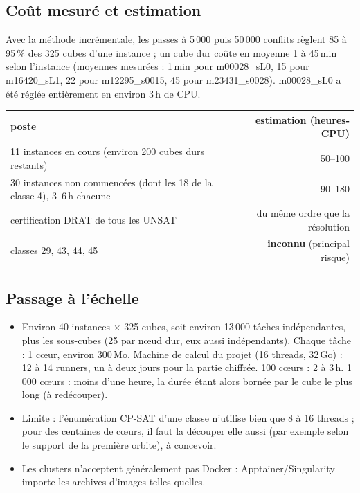\subsection{Coût mesuré et estimation}
Avec la méthode incrémentale, les passes à 5\,000 puis 50\,000 conflits règlent 85 à 95\,\% des 325 cubes d'une instance ; un cube dur coûte
en moyenne 1 à 45\,min selon l'instance (moyennes mesurées : 1\,min pour m00028\_sL0, 15 pour m16420\_sL1, 22 pour m12295\_s0015, 45 pour
m23431\_s0028). m00028\_sL0 a été réglée entièrement en environ 3\,h de CPU.
\begin{center}\small\begin{tabular}{lr}
poste & estimation (heures-CPU)\\\hline
11 instances en cours (environ 200 cubes durs restants) & 50--100\\
30 instances non commencées (dont les 18 de la classe 4), 3--6\,h chacune & 90--180\\
certification DRAT de tous les UNSAT & du même ordre que la résolution\\
classes 29, 43, 44, 45 & \textbf{inconnu} (principal risque)
\end{tabular}\end{center}

\subsection{Passage à l'échelle}
\begin{itemize}[nosep]
\item Environ 40 instances $\times$ 325 cubes, soit environ 13\,000 tâches indépendantes, plus les sous-cubes (25 par nœud dur, eux aussi
indépendants). Chaque tâche : 1 cœur, environ 300\,Mo. Machine de calcul du projet (16 threads, 32\,Go) : 12 à 14 runners, un à deux jours pour la
partie chiffrée. 100 cœurs : 2 à 3\,h. 1\,000 cœurs : moins d'une heure, la durée étant alors bornée par le cube le plus long (à redécouper).
\item Limite : l'énumération CP-SAT d'une classe n'utilise bien que 8 à 16 threads ; pour des centaines de cœurs, il faut la découper elle aussi
(par exemple selon le support de la première orbite), à concevoir.
\item Les clusters n'acceptent généralement pas Docker : Apptainer/Singularity importe les archives d'images telles quelles.
\end{itemize}

